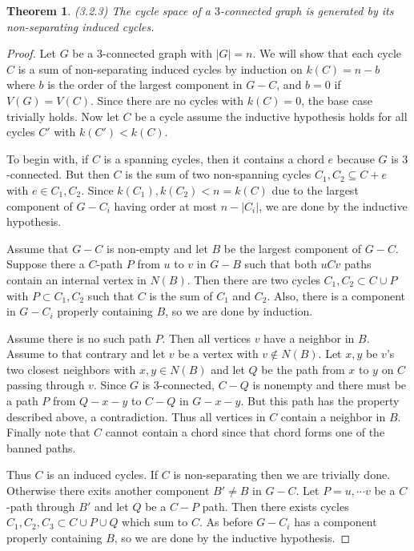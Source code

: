 \documentclass[12pt]{article}
\newtheorem{theorem}{Theorem}
\begin{document}
\begin{theorem} (3.2.3) The cycle space of a $3$-connected graph is
  generated by its non-separating induced cycles.
\end{theorem}
\begin{proof} Let $G$ be a $3$-connected graph with $|G| = n$. We will
  show that each cycle $C$ is a sum of non-separating induced cycles
  by induction on $k(C) = n - b$ where $b$ is the order of the largest
  component in $G-C$, and $b = 0$ if $V(G) = V(C)$. Since there are no
  cycles with $k(C) = 0$, the base case trivially holds. Now let $C$
  be a cycle assume the inductive hypothesis holds for all cycles $C'$
  with $k(C') < k(C)$.

  To begin with, if $C$ is a spanning cycles, then it contains a chord
  $e$ because $G$ is $3$-connected. But then $C$ is the sum of two
  non-spanning cycles $C_1,C_2 \subseteq C + e$ with $e \in C_1,
  C_2$. Since $k(C_1),k(C_2) < n = k(C)$ due to the largest component
  of $G -C_i$ having order at most $n - |C_i|$, we are done by the
  inductive hypothesis.

  Assume that $G-C$ is non-empty and let $B$ be the largest component
  of $G-C$. Suppose there a $C$-path $P$ from $u$ to $v$ in $G-B$ such
  that both $uCv$ paths contain an internal vertex in $N(B)$. Then
  there are two cycles $C_1,C_2 \subset C \cup P$ with
  $P \subset C_1, C_2$ such that $C$ is the sum of $C_1$ and
  $C_2$. Also, there is a component in $G - C_i$ properly containing
  $B$, so we are done by induction.

  Assume there is no such path $P$. Then all vertices $v$ have a
  neighbor in $B$. Assume to that contrary and let $v$ be a vertex
  with $v \notin N(B)$. Let $x,y$ be $v$'s two closest neighbors with
  $x,y \in N(B)$ and let $Q$ be the path from $x$ to $y$ on $C$
  passing through $v$. Since $G$ is $3$-connected, $C-Q$ is nonempty
  and there must be a path $P$ from $Q-x-y$ to $C-Q$ in $G - x -
  y$. But this path has the property described above, a
  contradiction. Thus all vertices in $C$ contain a neighbor in
  $B$. Finally note that $C$ cannot contain a chord since that chord
  forms one of the banned paths.

  Thus $C$ is an induced cycles. If $C$ is non-separating then we are
  trivially done. Otherwise there exits another component $B' \neq B$
  in $G-C$. Let $P = u, \cdots v$ be a $C$-path through $B'$ and let
  $Q$ be a $C-P$ path. Then there exists cycles
  $C_1, C_2, C_3 \subset C \cup P \cup Q$ which sum to $C$. As before
  $G - C_i$ has a component properly containing $B$, so we are done by
  the inductive hypothesis.
\end{proof}
\end{document}

